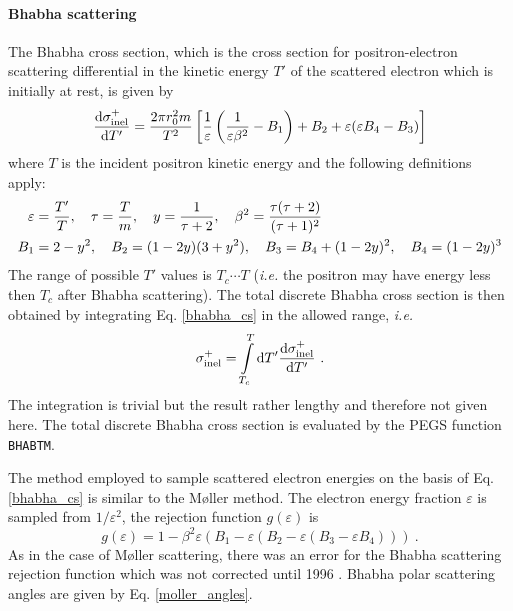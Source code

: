 \paragraph{Bhabha scattering} \hfill
{}

The Bhabha cross section, which is the cross section
for positron-electron scattering differential in the kinetic energy
$T'$ of the scattered electron which is initially at rest, is
given by \cite{Ne85}
\begin{equation}
\label{bhabha_cs}
{{\rm d} \sigma_{\rm inel}^+ \over  {\rm d}T'} =
{2 \pi r_0^2 m \over T^2} \left[ \frac{1}{\varepsilon}\left(
{1 \over \varepsilon \beta^2} - B_1 \right) + B_2 + \varepsilon
(\varepsilon B_4 - B_3 ) \right]
\end{equation}
where $T$ is the incident positron kinetic energy and
the following definitions apply:
\begin{equation}
\label{vhabha_cs1}
\begin{split}
\varepsilon & = \frac{T'}{T}, \quad \tau = \frac{T}{m},
\quad y = {1 \over \tau + 2}, \quad \beta^2 = {\tau (\tau + 2) \over
(\tau + 1)^2} \\
B_1 &= 2 - y^2, \quad B_2 = (1 - 2 y)(3 + y^2), \quad B_3 = B_4 +
(1 - 2 y)^2, \quad B_4 = (1 - 2 y)^3
\end{split}
\end{equation}
The range of possible $T'$ values is $T_c \cdots T$
({\em i.e.} the positron may have energy less then $T_c$
after Bhabha scattering).
The total discrete Bhabha cross section is then obtained
by integrating Eq. \eqref{bhabha_cs} in the allowed range,
{\em i.e.}
\begin{equation}
\sigma_{\rm inel}^+ = \int\limits_{T_c}^T {\rm d}T'
{{\rm d} \sigma_{\rm inel}^+ \over  {\rm d}T'}~.
\end{equation}
The integration is trivial but the result rather lengthy and therefore not
given here. The total discrete Bhabha cross section is evaluated
by the PEGS function {\tt BHABTM}.

The method employed to sample scattered electron energies on the basis
of Eq. \eqref{bhabha_cs} is similar to the M{\o}ller method.
The electron energy fraction $\varepsilon$ is sampled from
$1/\varepsilon^2$, the rejection function $g(\varepsilon)$ is
\begin{equation}
g(\varepsilon) = 1 - \beta^2 \varepsilon (B_1 - \varepsilon (B_2
- \varepsilon (B_3 - \varepsilon B_4)))~.
\end{equation}
As in the case of M{\o}ller scattering, there was an error for
the Bhabha scattering rejection function which was not corrected
until 1996 \cite{Bi96b}. Bhabha polar scattering angles are
given by Eq. \eqref{moller_angles}.

